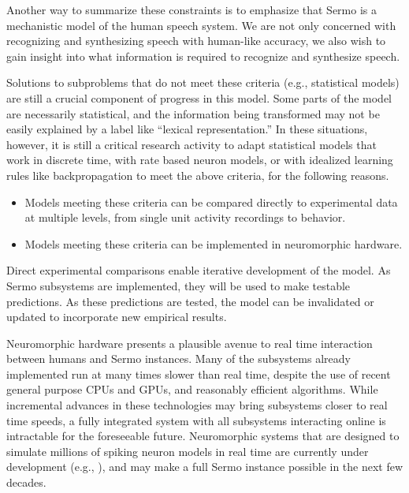 Another way to summarize these constraints
is to emphasize that Sermo
is a mechanistic model
of the human speech system.
We are not only concerned with
recognizing and synthesizing speech
with human-like accuracy,
we also wish to gain insight
into what information is required
to recognize and synthesize speech.

Solutions to subproblems that do not
meet these criteria
(e.g., statistical models)
are still a crucial component
of progress in this model.
Some parts of the model are
necessarily statistical,
and the information being transformed
may not be easily explained
by a label like ``lexical representation.''
In these situations,
however, it is still a critical research activity
to adapt statistical models that work in
discrete time, with rate based neuron models,
or with idealized learning rules like backpropagation
to meet the above criteria,
for the following reasons.

\begin{itemize}
  \item Models meeting these criteria can be compared directly
    to experimental data at multiple levels,
    from single unit activity recordings to behavior.
  \item Models meeting these criteria can be implemented
    in neuromorphic hardware.
\end{itemize}

Direct experimental comparisons enable
iterative development of the model.
As Sermo subsystems are implemented,
they will be used to make testable predictions.
As these predictions are tested,
the model can be invalidated
or updated to incorporate new empirical results.

Neuromorphic hardware
presents a plausible avenue
to real time interaction
between humans and Sermo instances.
Many of the subsystems already implemented
run at many times slower than real time,
despite the use of recent general purpose
CPUs and GPUs,
and reasonably efficient algorithms.
While incremental advances
in these technologies may
bring subsystems closer to real time speeds,
a fully integrated system
with all subsystems interacting online
is intractable for the foreseeable future.
Neuromorphic systems that are designed
to simulate millions of spiking neuron models
in real time
are currently under development
(e.g., \citealt{furber2013,benjamin2014}),
and may make a full Sermo instance
possible in the next few decades.

